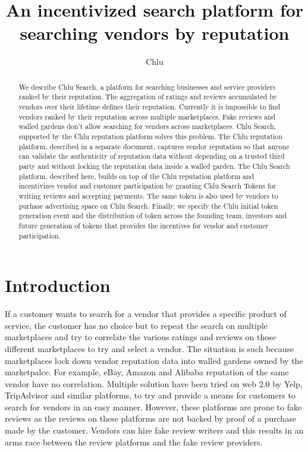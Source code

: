 \documentclass[a4paper]{article}
\title{An incentivized search platform for searching vendors by reputation}
\author{
  Chlu
}
\begin{document}
\maketitle

\begin{abstract}

  We describe Chlu Search, a platform for searching businesses and
  service providers ranked by their reputation. The aggregation of
  ratings and reviews accumulated by vendors over their lifetime
  defines their reputation. Currently it is impossible to find vendors
  ranked by their reputation across multiple marketplaces. Fake
  reviews and walled gardens don't allow searching for vendors across
  marketplaces. Chlu Search, supported by the Chlu reputation platform
  solves this problem. The Chlu reputation platform, described in a
  separate document, captures vendor reputation so that anyone can
  validate the authenticity of reputation data without depending on a
  trusted third party and without locking the reputation data inside a
  walled garden. The Chlu Search platform, described here, builds on
  top of the Chlu reputation platform and incentivizes vendor and
  customer participation by granting Chlu Search Tokens for writing
  reviews and accepting payments. The same token is also used by
  vendors to purhase advertising space on Chlu Search. Finally, we
  specify the Chlu initial token generation event and the distribution
  of token across the founding team, investors and future generation
  of tokens that provides the incentives for vendor and customer
  participation.

\end{abstract}

\section{Introduction}

If a customer wants to search for a vendor that provides a specific
product of service, the customer has no choice but to repeat the
search on multiple marketplaces and try to correlate the various
ratings and reviews on those different marketplaces to try and select
a vendor. The situation is such because marketplaces lock down vendor
reputation data into walled gardens owned by the marketpalce. For
example, eBay, Amazon and Alibaba reputation of the same vendor have
no correlation. Multiple solution have been tried on web 2.0 by Yelp,
TripAdvisor and similar platforms, to try and provide a means for
customers to search for vendors in an easy manner. However, these
platforms are prone to fake reviews as the reviews on these platforms
are not backed by proof of a purchase made by the customer. Vendors
can hire fake review writers and this results in an arms race between
the review platforms and the fake review providers.
\end{document}

